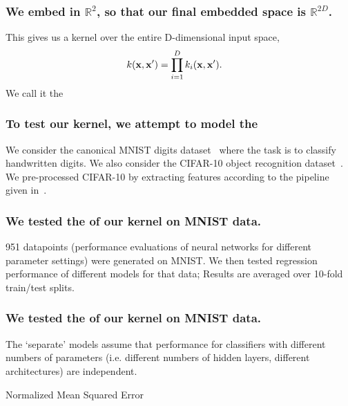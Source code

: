 \documentclass[12pt,onlymath]{beamer}
\begin{document}
\begin{frame}\frametitle{We embed  in $\mathbb{R}^2$, so that our final embedded space is $\mathbb{R}^{2D}$.}
This gives us a kernel over the entire D-dimensional input space,
\vfill
\begin{align*}
	k(\mathbf{x}, \mathbf{x}') & = \prod_{i=1}^D k_i(\mathbf{x}, \mathbf{x}').
\end{align*}
\vfill
We call it the 
\end{frame}

\begin{frame}\frametitle{To test our kernel, we attempt to model the }
We consider the canonical MNIST digits dataset~\citep{lecun-1998a} where the task is to classify handwritten digits.
\vfill
We also consider the CIFAR-10 object recognition dataset~\citep{Krizhevsky-2009a}.
We pre-processed CIFAR-10 by extracting features according to the pipeline given in~\cite{coates2010analysis}.
\end{frame}


\begin{frame}\frametitle{We tested the  of our kernel on MNIST data.}
951 datapoints (performance evaluations of neural networks for different parameter settings) were generated on MNIST.  
\vfill
We then tested regression performance of different models for that data; Results are averaged over 10-fold train/test splits.
\end{frame}

\begin{frame}\frametitle{We tested the  of our kernel on MNIST data.}
The `separate' models assume that performance for classifiers with different numbers of parameters (i.e. different numbers of hidden layers, different architectures) are independent. 
\vfill
\begin{table}[h!]
\caption{\small Normalized Mean Squared Error \label{tab:nn_error}}
\label{tbl:nn_nmse}

%
\vspace{-0.3cm}
\end{table}
\end{frame}
\end{document}
